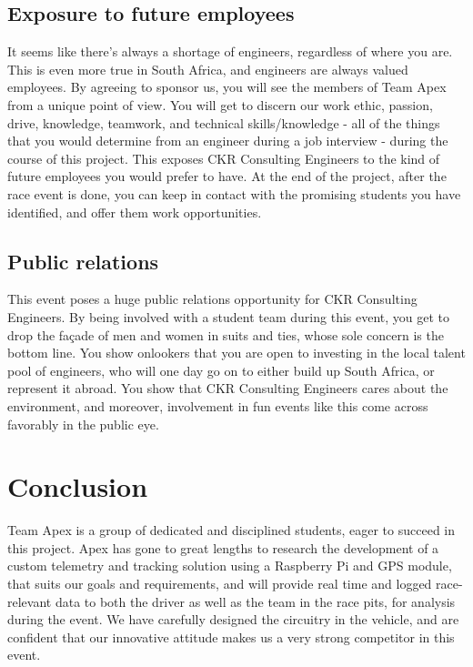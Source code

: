 \documentclass[a4paper, 12pt]{article}
\newcommand{\company}{CKR Consulting Engineers}
\begin{document}
		\subsection{Exposure to future employees} %
		\label{sub:exposure_to_future_employees}
			It seems like there's always a shortage of engineers, regardless of where you are. This is even more true in South Africa, and engineers are always valued employees. By agreeing to sponsor us, you will see the members of Team Apex from a unique point of view. You will get to discern our work ethic, passion, drive, knowledge, teamwork, and technical skills/knowledge - all of the things that you would determine from an engineer during a job interview - during the course of this project. This exposes \company{} to the kind of future employees you would prefer to have. At the end of the project, after the race event is done, you can keep in contact with the promising students you have identified, and offer them work opportunities.
		\subsection{Public relations} %
		\label{sub:public_relations}
			This event poses a huge public relations opportunity for \company{}. By being involved with a student team during this event, you get to drop the fa\c{c}ade of men and women in suits and ties, whose sole concern is the bottom line. You show onlookers that you are open to investing in the local talent pool of engineers, who will one day go on to either build up South Africa, or represent it abroad. You show that \company{} cares about the environment, and moreover, involvement in fun events like this come across favorably in the public eye.
	
	\section{Conclusion} %
	\label{sec:conclusion}
		Team Apex is a group of dedicated and disciplined students, eager to succeed in this project. Apex has gone to great lengths to research the development of a custom telemetry and tracking solution using a Raspberry Pi and GPS module, that suits our goals and requirements, and will provide real time and logged race-relevant data to both the driver as well as the team in the race pits, for analysis during the event. We have carefully designed the circuitry in the vehicle, and are confident that our innovative attitude makes us a very strong competitor in this event.
\end{document}
